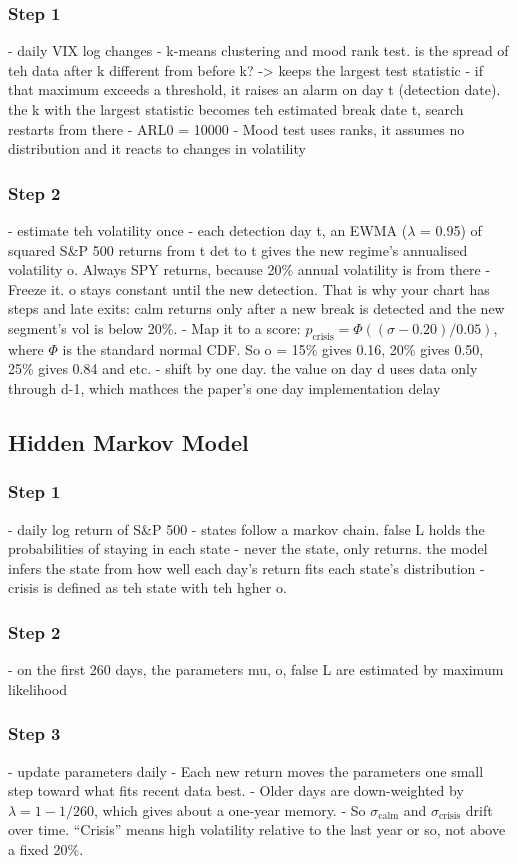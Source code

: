 \documentclass[12pt]{article}
\begin{document}
\subsubsection{Step 1}
- daily VIX log changes 
- k-means clustering and mood rank test. is the spread of teh data after k different 
from before k? -> keeps the largest test statistic
- if that maximum exceeds a threshold, it raises an alarm on day t (detection date). the k with the largest
statistic becomes teh estimated break date t, search restarts from there
- ARL0 = 10000
- Mood test uses ranks, it assumes no distribution and it reacts to changes in volatility
\subsubsection{Step 2}
- estimate teh volatility once
- each detection day t, an EWMA ($\lambda$ = 0.95) of squared S\&P 500 returns from t det to t gives
the new regime's annualised volatility o. Always SPY returns, because 20\% annual volatility is from there
- Freeze it. o stays constant until the new detection. That is why your chart has steps and late exits: 
calm returns only after a new break is detected and the new segment’s vol is below 20\%.
- Map it to a score: $p_{\text{crisis}} = \Phi((\sigma - 0.20) / 0.05)$, where $\Phi$ is the standard normal CDF. So o = 15\%
gives 0.16, 20\% gives 0.50, 25\% gives 0.84 and etc.
- shift by one day. the value on day d uses data only through d-1, which mathces the paper's one day 
implementation delay

\subsection{Hidden Markov Model}
\subsubsection{Step 1}
- daily log return of S\&P 500
- states follow a markov chain. false L holds the probabilities of staying in each state
- never the state, only returns. the model infers the state from how well each day's return fits each 
state's distribution
- crisis is defined as teh state with teh hgher o. 
\subsubsection{Step 2}
- on the first 260 days, the parameters mu, o, false L are estimated by maximum likelihood
\subsubsection{Step 3}
- update parameters daily
- Each new return moves the parameters one small step toward what fits recent data best.
- Older days are down-weighted by $\lambda = 1 - 1/260$, which gives about a one-year memory.
- So $\sigma_{\text{calm}}$ and $\sigma_{\text{crisis}}$ drift over time. “Crisis” means high volatility relative to the last year or so, not above a fixed 20\%.
\end{document}
